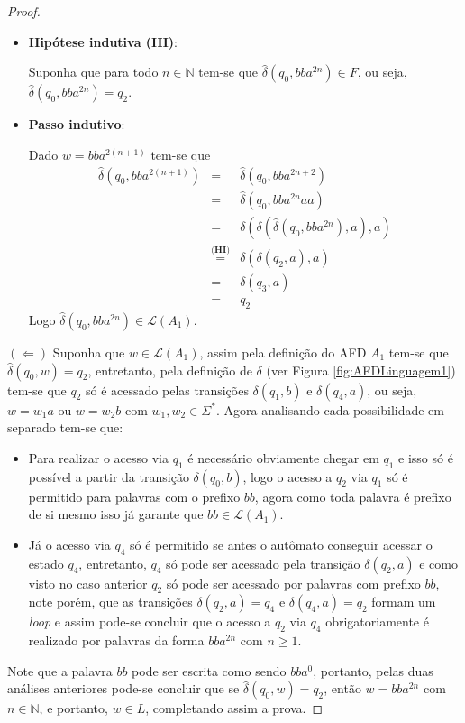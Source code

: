 \begin{exem}
\begin{proof}
\begin{itemize}
			\item \textbf{Hipótese indutiva (HI)}:
			
			Suponha que para todo $n \in \mathbb{N}$ tem-se que $\widehat{\delta}(q_0, bba^{2n}) \in F$, ou seja, $\widehat{\delta}(q_0, bba^{2n}) = q_2$.
			
			\item \textbf{Passo indutivo}:
			
			Dado $w = bba^{2(n+1)}$ tem-se que
			\begin{eqnarray*}
				\widehat{\delta}(q_0, bba^{2(n+1)}) & = & \widehat{\delta}(q_0, bba^{2n + 2})\\
				& = & \widehat{\delta}(q_0, bba^{2n}aa)\\
				& = & \delta(\delta(\widehat{\delta}(q_0, bba^{2n}), a), a)\\
				& \stackrel{\textbf{(HI)}}{=} & \delta(\delta(q_2, a), a)\\
				& = & \delta(q_3, a)\\
				& = & q_2
			\end{eqnarray*} 
			Logo $\widehat{\delta}(q_0, bba^{2n}) \in \mathcal{L}(A_1)$.
		\end{itemize} 
		$(\Leftarrow)$ Suponha que $w \in \mathcal{L}(A_1)$, assim pela definição do AFD $A_1$ tem-se que $\widehat{\delta}(q_0, w) = q_2$, entretanto, pela definição de $\delta$ (ver Figura \ref{fig:AFDLinguagem1}) tem-se que $q_2$ só é acessado pelas transições $\delta(q_1, b)$ e $\delta(q_4, a)$, ou seja, $w = w_1a$ ou $w = w_2b$ com $w_1, w_2 \in \Sigma^*$. Agora analisando cada possibilidade em separado tem-se que: 
		\begin{itemize}
			\item Para realizar o acesso via $q_1$ é necessário obviamente chegar em $q_1$ e isso só é possível a partir da transição $\delta(q_0, b)$, logo o acesso a $q_2$ via $q_1$ só é permitido para palavras com o prefixo $bb$, agora como toda palavra é prefixo de si mesmo isso já garante que $bb \in \mathcal{L}(A_1)$.
			\item Já o acesso via $q_4$ só é permitido se antes o autômato conseguir acessar o estado $q_4$, entretanto, $q_4$ só pode ser acessado pela transição $\delta(q_2, a)$ e como visto no caso anterior $q_2$ só pode ser acessado por palavras com prefixo $bb$, note porém, que as transições $\delta(q_2, a) = q_4$ e $\delta(q_4, a) = q_2$ formam um \textit{loop} e assim pode-se concluir que o acesso a $q_2$ via $q_4$ obrigatoriamente é realizado por palavras da forma $bba^{2n}$ com $n \geq 1$.
		\end{itemize}
		Note que a palavra $bb$ pode ser escrita como sendo $bba^0$, portanto, pelas duas análises anteriores pode-se concluir que se $\widehat{\delta}(q_0, w) = q_2$, então $w = bba^{2n}$ com $n \in \mathbb{N}$, e portanto, $w \in L$, completando assim a prova. 
	\end{proof}
\end{exem}

